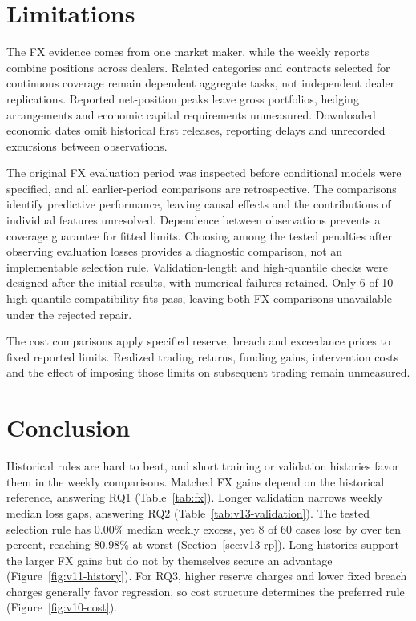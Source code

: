 \section{Limitations}\label{sec:limitations}

The FX evidence comes from one market maker, while the weekly reports combine positions across dealers. Related categories and contracts selected for continuous coverage remain dependent aggregate tasks, not independent dealer replications. Reported net-position peaks leave gross portfolios, hedging arrangements and economic capital requirements unmeasured. Downloaded economic dates omit historical first releases, reporting delays and unrecorded excursions between observations.

The original FX evaluation period was inspected before conditional models were specified, and all earlier-period comparisons are retrospective. The comparisons identify predictive performance, leaving causal effects and the contributions of individual features unresolved. Dependence between observations prevents a coverage guarantee for fitted limits. Choosing among the tested penalties after observing evaluation losses provides a diagnostic comparison, not an implementable selection rule. Validation-length and high-quantile checks were designed after the initial results, with numerical failures retained. Only 6 of 10 high-quantile compatibility fits pass, leaving both FX comparisons unavailable under the rejected repair.

The cost comparisons apply specified reserve, breach and exceedance prices to fixed reported limits. Realized trading returns, funding gains, intervention costs and the effect of imposing those limits on subsequent trading remain unmeasured.

\FloatBarrier

\section{Conclusion}\label{sec:conclusion}

Historical rules are hard to beat, and short training or validation histories favor them in the weekly comparisons. Matched FX gains depend on the historical reference, answering RQ1 (Table~\ref{tab:fx}). Longer validation narrows weekly median loss gaps, answering RQ2 (Table~\ref{tab:v13-validation}). The tested selection rule has 0.00\% median weekly excess, yet 8 of 60 cases lose by over ten percent, reaching 80.98\% at worst (Section~\ref{sec:v13-rp}). Long histories support the larger FX gains but do not by themselves secure an advantage (Figure~\ref{fig:v11-history}). For RQ3, higher reserve charges and lower fixed breach charges generally favor regression, so cost structure determines the preferred rule (Figure~\ref{fig:v10-cost}).

